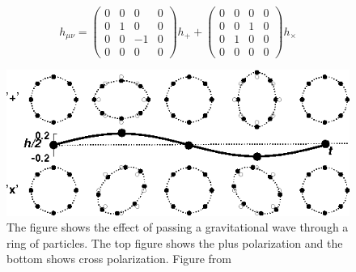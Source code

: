 \documentclass{ttuthes2007}
\begin{document}
\begin{equation*}                                                               
h_{\mu\nu}=     
 \begin{pmatrix}                                                                
    0 & 0 & 0 & 0 \\                                                            
    0 & 1 & 0 & 0 \\                                                            
    0 & 0 & -1 & 0 \\                                                            
    0 & 0 & 0 & 0                                                               
 \end{pmatrix}
h_+  
+
 \begin{pmatrix}                                                                
    0 & 0 & 0 & 0 \\                                                            
    0 & 0 & 1 & 0 \\                                                            
    0 & 1 & 0 & 0 \\                                                            
    0 & 0 & 0 & 0                                                               
 \end{pmatrix}
h_\times                                                                  
\end{equation*} 

\begin{figure}[h!]                                                              
	\includegraphics[width=\textwidth]{figure/polarization.png}
	\caption{The figure shows the effect of passing a gravitational wave
through a ring of particles. The top figure shows the plus polarization and the
bottom shows cross polarization. Figure from ~\citet{Schutz}}                                                     
        \label{fig:polarization}
\end{figure}
\end{document}
